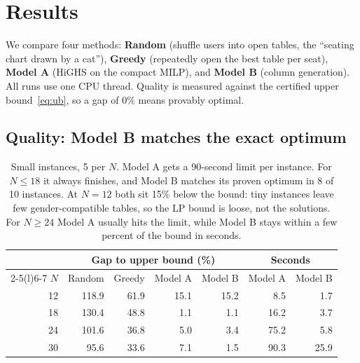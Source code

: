 \section{Results}
\label{sec:results}

We compare four methods: \textbf{Random} (shuffle users into open tables, the ``seating chart drawn by a cat''), \textbf{Greedy} (repeatedly open the best table per seat), \textbf{Model A} (HiGHS on the compact MILP), and \textbf{Model B} (column generation). All runs use one CPU thread. Quality is measured against the certified upper bound~\eqref{eq:ub}, so a gap of $0\%$ means provably optimal.

\subsection{Quality: Model B matches the exact optimum}

\begin{table}[h]
\centering\small
\begin{tabular}{@{}r rrrr rr@{}}
\toprule
& \multicolumn{4}{c}{Gap to upper bound (\%)} & \multicolumn{2}{c}{Seconds} \\
\cmidrule(lr){2-5}\cmidrule(l){6-7}
$N$ & Random & Greedy & Model A & Model B & Model A & Model B \\
\midrule
12 & 118.9 & 61.9 & 15.1 & 15.2 & 8.5 & 1.7 \\
18 & 130.4 & 48.8 & 1.1 & 1.1 & 16.2 & 3.7 \\
24 & 101.6 & 36.8 & 5.0 & 3.4 & 75.2 & 5.8 \\
30 & 95.6 & 33.6 & 7.1 & 1.5 & 90.3 & 25.9 \\
\bottomrule
\end{tabular}
\caption{Small instances, 5 per $N$. Model A gets a 90-second limit per instance. For $N\le 18$ it always finishes, and Model B matches its proven optimum in 8 of 10 instances. At $N=12$ both sit 15\% below the bound: tiny instances leave few gender-compatible tables, so the LP bound is loose, not the solutions. For $N\ge 24$ Model A usually hits the limit, while Model B stays within a few percent of the bound in seconds.}
\label{tab:e1}
\end{table}

